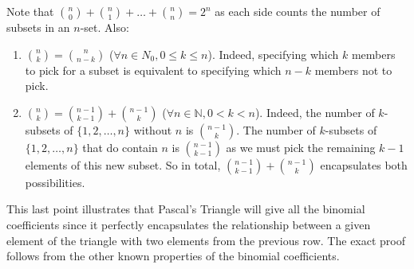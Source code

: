 Note that \(\binom{n}{0} + \binom{n}{1} + \dots + \binom{n}{n} = 2^n\) as each side counts the number of subsets in an \(n\)-set.
Also:
\begin{enumerate}
	\item \(\binom{n}{k} = \binom{n}{n-k}\) (\(\forall n \in N_0, 0 \leq k \leq n\)).
	      Indeed, specifying which \(k\) members to pick for a subset is equivalent to specifying which \(n-k\) members not to pick.
	\item \(\binom{n}{k} = \binom{n-1}{k-1} + \binom{n-1}{k}\) (\(\forall n \in \mathbb N, 0 < k < n\)).
	      Indeed, the number of \(k\)-subsets of \(\{ 1, 2, \dots, n \}\) without \(n\) is \(\binom{n-1}{k}\).
	      The number of \(k\)-subsets of \(\{ 1, 2, \dots, n \}\) that do contain \(n\) is \(\binom{n-1}{k-1}\) as we must pick the remaining \(k-1\) elements of this new subset.
	      So in total, \(\binom{n-1}{k-1} + \binom{n-1}{k}\) encapsulates both possibilities.
\end{enumerate}
This last point illustrates that Pascal's Triangle will give all the binomial coefficients since it perfectly encapsulates the relationship between a given element of the triangle with two elements from the previous row.
The exact proof follows from the other known properties of the binomial coefficients.
